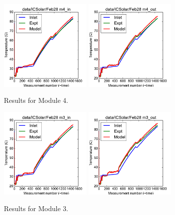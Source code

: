 \documentclass{article}
\begin{document}
\clearpage
\begin{figure}[!ht]
\centering
\includegraphics[width=0.4\textwidth]{../../data/ICSolar/images/Feb28_m4_in.pdf}\hspace{0.05\textwidth}
\includegraphics[width=0.4\textwidth]{../../data/ICSolar/images/Feb28_m4_out.pdf}\hspace{0.05\textwidth}\\
\caption{Results for Module 4.}\end{figure}
\begin{figure}[!ht]
\centering
\includegraphics[width=0.4\textwidth]{../../data/ICSolar/images/Feb28_m3_in.pdf}\hspace{0.05\textwidth}
\includegraphics[width=0.4\textwidth]{../../data/ICSolar/images/Feb28_m3_out.pdf}\hspace{0.05\textwidth}\\
\caption{Results for Module 3.}\end{figure}
\end{document}
